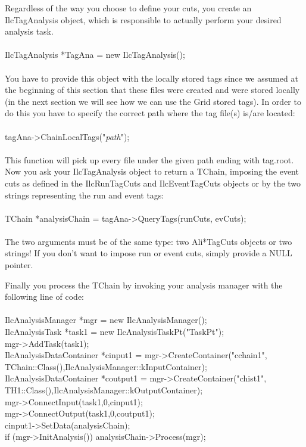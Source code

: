 \vspace{0.6cm}
Regardless of the way you choose to define your cuts, you create an {\ttfamily IlcTagAnalysis} object, which is responsible to actually perform your desired analysis task.\\
\\
{\ttfamily IlcTagAnalysis *TagAna = new IlcTagAnalysis();}\\
\\
You have to provide this object with the locally stored tags since we assumed at the beginning of this section that these files were created and were stored locally (in the next section we will see how we can use the Grid stored tags). In order to do this you have to specify the correct path where the tag file(s) is/are located:\\ 
\\
{\ttfamily tagAna->ChainLocalTags("\emph{path}");}\\
\\
This function will pick up every file under the given path ending with {\ttfamily tag.root}. Now you ask your {\ttfamily IlcTagAnalysis} object to return a {\ttfamily TChain}, imposing the event cuts as defined in the {\ttfamily IlcRunTagCuts} and {\ttfamily IlcEventTagCuts} objects or by the two strings representing the run and event tags:\\
\\
{\ttfamily TChain *analysisChain = tagAna->QueryTags(runCuts, evCuts);}\\
\\
The two arguments must be of the same type: two Ali*TagCuts objects or two strings! If you don't want to impose run or event cuts, simply provide a NULL pointer.

Finally you process the {\ttfamily TChain} by invoking your analysis manager with the following line of code:\\
\\
{\ttfamily  IlcAnalysisManager *mgr = new IlcAnalysisManager();}\\
{\ttfamily  IlcAnalysisTask *task1 = new IlcAnalysisTaskPt("TaskPt");}\\
{\ttfamily  mgr->AddTask(task1);}\\
{\ttfamily  IlcAnalysisDataContainer *cinput1 = mgr->CreateContainer("cchain1", TChain::Class(),IlcAnalysisManager::kInputContainer);}\\
{\ttfamily  IlcAnalysisDataContainer *coutput1 = mgr->CreateContainer("chist1", TH1::Class(),IlcAnalysisManager::kOutputContainer);}\\
{\ttfamily  mgr->ConnectInput(task1,0,cinput1);}\\
{\ttfamily  mgr->ConnectOutput(task1,0,coutput1);}\\
{\ttfamily  cinput1->SetData(analysisChain);}\\  
{\ttfamily  if (mgr->InitAnalysis()) analysisChain->Process(mgr);}\\

